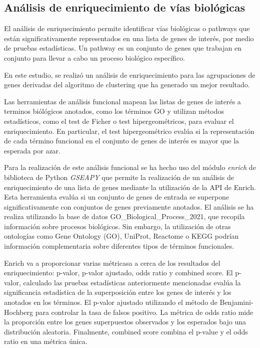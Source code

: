 \subsection{Análisis de enriquecimiento de vías biológicas}

El análisis de enriquecimiento permite identificar vías biológicas o pathways que están significativamente representados en una lista de genes de interés, por medio de pruebas estadísticas. Un pathway es un conjunto de genes que trabajan en conjunto para llevar a cabo un proceso biológico específico.\cite{Reimand2019}

En este estudio, se realizó un análisis de enriquecimiento para las agrupaciones de genes derivadas del algoritmo de clustering que ha generado un mejor resultado.

Las herramientas de análisis funcional mapean las listas de genes de interés a terminos biólógicos anotados, como los términos GO y utilizan métodos estadísticos, como el test de Ficher o test hipergeométricos,
para evaluar el enriquecimiento.\cite{10.1093/nar/gkn923} En particular, el test hipergeométrico evalúa si la representación de cada término funcional en el conjunto de genes de interés 
es mayor que la esperada por azar. 


Para la realización de este análisis funcional se ha hecho uso del módulo \textit{enrich} de biblioteca de Python \textit{GSEAPY} que permite la realización de un 
análisis de enriquecimiento de una lista de genes mediante la utilización de la API de Enrich. Esta herramienta evalúa si un conjunto de genes de entrada se superpone significativamente con conjuntos de genes previamente anotados. 
El análisis se ha realiza utilizando la base de datos  GO\_Biological\_Process\_2021, que recopila información sobre procesos biológicos. Sin embargo, la utilización de otras ontologías como 
Gene Ontology (GO), UniProt, Reactome o KEGG podrían  información complementaria sobre diferentes tipos de términos funcionales.

Enrich va a proporcionar varias métricasa a cerca de los resultados del enriquecimiento: p-valor, p-valor ajustado, odds ratio y combined score.
El p-valor, calculado las pruebas estadísticas anteriormente mencionadas evalúa la significancia estadística de la superposición entre los genes de interés y los anotados en los términos. El p-valor ajustado
utilizando el método de Benjamini-Hochberg para controlar la tasa de falsos positivo. La métrica de odds ratio mide la proporción entre los genes superpuestos observados y los esperados bajo una distribución aleatoria.
Finalmente, combined score combina el p-value y el odds ratio en una métrica única. \cite{maayanlab_enrichr_help}

